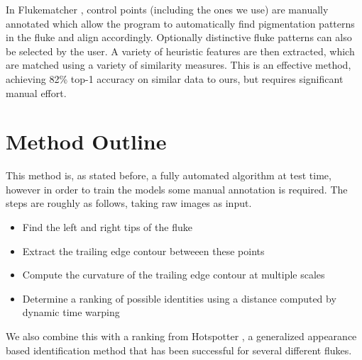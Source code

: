 In Flukematcher \cite{kniest2010fluke}, control points (including the ones we use) are manually annotated which allow the program to automatically find pigmentation patterns in the fluke and align accordingly.
Optionally distinctive fluke patterns can also be selected by the user.
A variety of heuristic features are then extracted, which are matched using a variety of similarity measures.
This is an effective method, achieving 82\% top-1 accuracy on similar data to ours, but requires significant manual effort.

\section{Method Outline}

This method is, as stated before, a fully automated algorithm at test time, however in order to train the models some manual annotation is required.
The steps are roughly as follows, taking raw images as input.

\begin{itemize}
	\item Find the left and right tips of the fluke
	\item Extract the trailing edge contour betweeen these points
	\item Compute the curvature of the trailing edge contour at multiple scales
	\item Determine a ranking of possible identities using a distance computed by dynamic time warping 
\end{itemize}

We also combine this with a ranking from Hotspotter \cite{crall_hotspotter_2013}, a generalized appearance based identification method that has been successful for several different flukes. 



